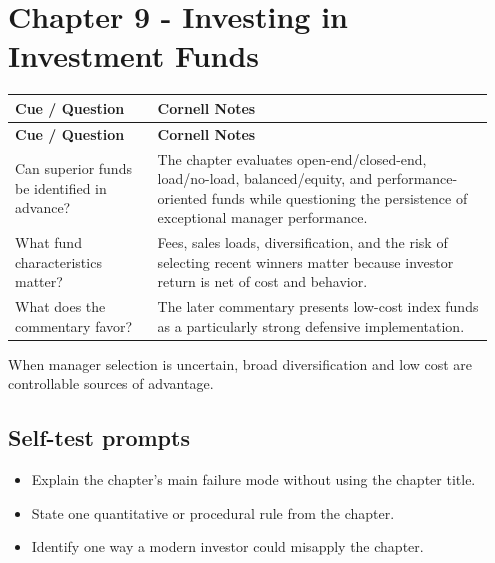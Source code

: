 \documentclass[11pt]{article}
\begin{document}
\section{Chapter 9 - Investing in Investment Funds}
\begin{longtable}{@{}>{\raggedright\arraybackslash}p{0.29\linewidth}>{\raggedright\arraybackslash}p{0.66\linewidth}@{}}\toprule\textbf{Cue / Question} & \textbf{Cornell Notes}\\\midrule\endfirsthead\toprule\textbf{Cue / Question} & \textbf{Cornell Notes}\\\midrule\endhead
Can superior funds be identified in advance? & The chapter evaluates open-end/closed-end, load/no-load, balanced/equity, and performance-oriented funds while questioning the persistence of exceptional manager performance. \\
What fund characteristics matter? & Fees, sales loads, diversification, and the risk of selecting recent winners matter because investor return is net of cost and behavior. \\
What does the commentary favor? & The later commentary presents low-cost index funds as a particularly strong defensive implementation. \\
\bottomrule\end{longtable}
\begin{principlebox}When manager selection is uncertain, broad diversification and low cost are controllable sources of advantage.\end{principlebox}
\subsection*{Self-test prompts}\begin{itemize}\item Explain the chapter's main failure mode without using the chapter title.\item State one quantitative or procedural rule from the chapter.\item Identify one way a modern investor could misapply the chapter.\end{itemize}
\end{document}

